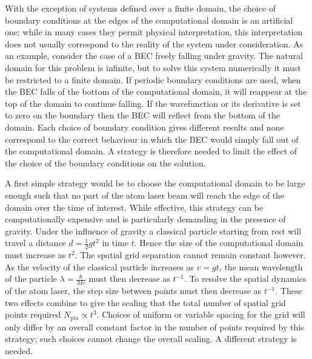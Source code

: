 With the exception of systems defined over a finite domain, the choice of boundary conditions at the edges of the computational domain is an artificial one; while in many cases they permit physical interpretation, this interpretation does not usually correspond to the reality of the system under consideration. As an example, consider the case of a BEC freely falling under gravity. The natural domain for this problem is infinite, but to solve this system numerically it must be restricted to a finite domain. If periodic boundary conditions are used, when the BEC falls of the bottom of the computational domain, it will reappear at the top of the domain to continue falling. If the wavefunction or its derivative is set to zero on the boundary then the BEC will reflect from the bottom of the domain. Each choice of boundary condition gives different results and none correspond to the correct behaviour in which the BEC would simply fall out of the computational domain. A strategy is therefore needed to limit the effect of the choice of the boundary conditions on the solution.

A first simple strategy would be to choose the computational domain to be large enough such that no part of the atom laser beam will reach the edge of the domain over the time of interest. While effective, this strategy can be computationally expensive and is particularly demanding in the presence of gravity. Under the influence of gravity a classical particle starting from rest will travel a distance $d = \frac{1}{2}g t^2$ in time $t$. Hence the size of the computational domain must increase as $t^2$. The spatial grid separation cannot remain constant however. As the velocity of the classical particle increases as $v = gt$, the mean wavelength of the particle $\displaystyle \lambda = \frac{\hbar}{Mv}$ must then decrease as $t^{-1}$.  To resolve the spatial dynamics of the atom laser, the step size between points must then decrease as $t^{-1}$. These two effects combine to give the scaling that the total number of spatial grid points required $N_\text{pts} \propto t^3$. Choices of uniform or variable spacing for the grid will only differ by an overall constant factor in the number of points required by this strategy; such choices cannot change the overall scaling. A different strategy is needed.

